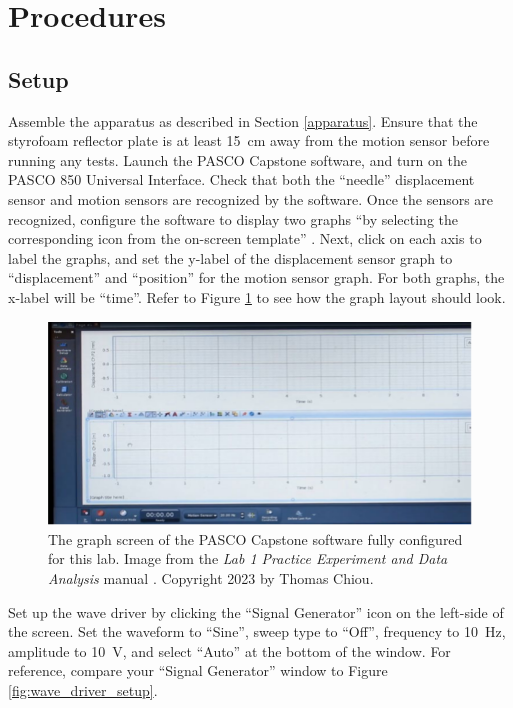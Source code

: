 \documentclass[12 pt]{report}
\begin{document}
\section{Procedures} \label{procedures}
\subsection{Setup} \label{procedures-setup}
Assemble the apparatus as described in Section \ref{apparatus}. Ensure that the styrofoam reflector plate is at least \qty{15}{cm} away from the motion sensor before running any tests. Launch the PASCO Capstone software, and turn on the PASCO 850 Universal Interface. Check that both the ``needle'' displacement sensor and motion sensors are recognized by the software. Once the sensors are recognized, configure the software to display two graphs ``by selecting the corresponding icon from the on-screen template'' \cite{lab_procedures}. Next, click on each axis to label the graphs, and set the y-label of the displacement sensor graph to ``displacement'' and ``position'' for the motion sensor graph. For both graphs, the x-label will be ``time''. Refer to Figure \ref{fig:pasco_main_page} to see how the graph layout should look.

\begin{figure}[ht]
\centering
\includegraphics[width=5in]{images/PASCO_Main_Page}
\caption{The graph screen of the PASCO Capstone software fully configured for this lab. Image from the \textit{Lab 1 Practice Experiment and Data Analysis} manual \cite{lab_procedures}. Copyright 2023 by Thomas Chiou.}
\label{fig:pasco_main_page}
\end{figure}

Set up the wave driver by clicking the ``Signal Generator'' icon on the left-side of the screen.  Set the waveform to ``Sine'', sweep type to ``Off'', frequency to \qty{10}{Hz}, amplitude to \qty{10}{V}, and select ``Auto'' at the bottom of the window. For reference, compare your ``Signal Generator'' window to Figure \ref{fig:wave_driver_setup}.
\end{document}
